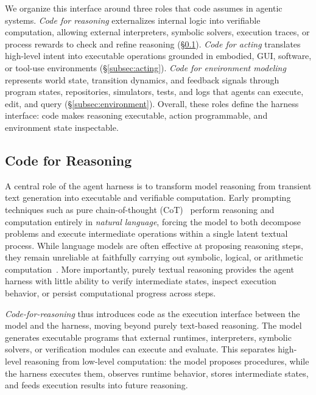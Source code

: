 We organize this interface around three roles that code assumes in
agentic systems. \emph{Code for reasoning} externalizes internal
logic into verifiable computation, allowing external interpreters,
symbolic solvers, execution traces, or process rewards to check
and refine reasoning (\S\ref{subsec:reasoning}). \emph{Code for
acting} translates high-level intent into executable operations
grounded in embodied, GUI, software, or tool-use environments
(\S\ref{subsec:acting}). \emph{Code for environment modeling}
represents world state, transition dynamics, and feedback signals
through program states, repositories, simulators, tests, and logs
that agents can execute, edit, and query
(\S\ref{subsec:environment}). Overall, these roles define the
harness interface: code makes reasoning executable, action
programmable, and environment state inspectable.





\subsection{Code for Reasoning}
\label{subsec:reasoning}

A central role of the agent harness is to transform model
reasoning from transient text generation into executable and verifiable computation. Early prompting techniques such as pure chain-of-thought (CoT)~\cite{wei2022chain} perform reasoning and computation
entirely in \textit{natural language}, forcing the model to both decompose problems and execute intermediate operations within a single latent textual process.
While language models are often effective at proposing reasoning steps, they remain unreliable at faithfully carrying out symbolic, logical, or arithmetic computation~\cite{gao2023pal}. More importantly, purely textual reasoning provides the agent harness
with little ability to verify intermediate states, inspect execution behavior, or persist computational progress across steps.

\textit{Code-for-reasoning} thus introduces code as the execution interface
between the model and the harness, moving beyond purely text-based reasoning. The model generates executable programs that external runtimes, interpreters, symbolic solvers, or verification modules can execute and evaluate.
This separates high-level reasoning from low-level computation:
the model proposes procedures, while the harness executes them,
observes runtime behavior, stores intermediate states, and feeds
execution results into future reasoning.

